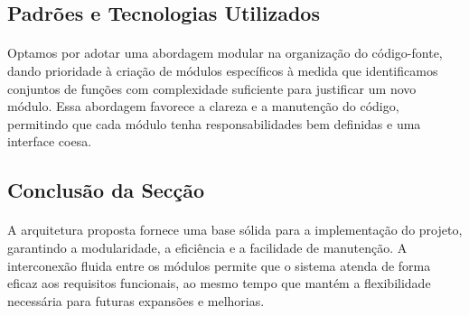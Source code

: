 \documentclass{article}
\begin{document}
\subsection{Padrões e Tecnologias Utilizados}
\paragraph{}Optamos por adotar uma abordagem modular na organização do código-fonte, dando prioridade à criação de módulos específicos à medida que identificamos conjuntos de funções com complexidade suficiente para justificar um novo módulo. Essa abordagem favorece a clareza e a manutenção do código, permitindo que cada módulo tenha responsabilidades bem definidas e uma interface coesa.

\subsection{Conclusão da Secção}
\paragraph{}A arquitetura proposta fornece uma base sólida para a implementação do projeto, garantindo a modularidade, a eficiência e a facilidade de manutenção. A interconexão fluida entre os módulos permite que o sistema atenda de forma eficaz aos requisitos funcionais, ao mesmo tempo que mantém a flexibilidade necessária para futuras expansões e melhorias.
\end{document}
